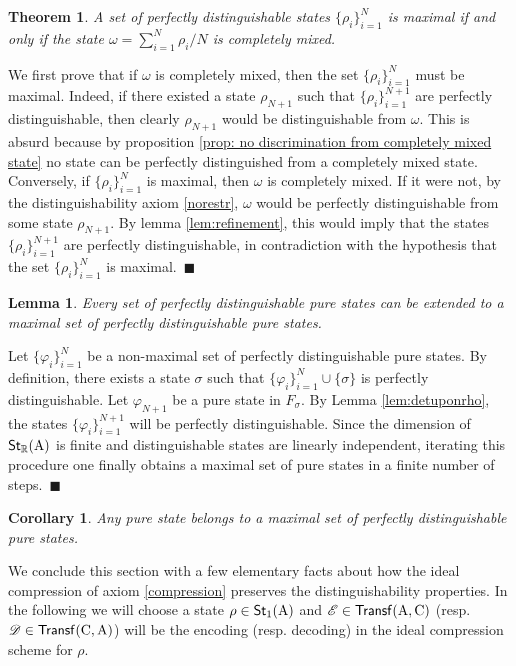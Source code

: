 \documentclass[12pt,aps,pra,showpacs,groupedaddress]{revtex4-1}
\newtheorem{lemma}{Lemma} \newtheorem{proposition}{Proposition}
\newtheorem{corollary}{Corollary} \newtheorem{theorem}{Theorem}
\def\Proof{\medskip\par\noindent{\bf Proof. }}
\def\qed{$\,\blacksquare$\par}
\def\rC{{\rm C}}
\def\Stset{{\mathsf{St}}}
\def\Trnset{{\mathsf{Transf}}}
\def\Reals{{\mathbb R}}
\begin{document}
\begin{theorem}
  A set of perfectly distinguishable states $\{\rho_i\}_{i=1}^N$ is maximal if and only if the state
  $\omega =\sum_{{i=1}}^{N} \rho_i/N$ is completely mixed.
  \label{theo:interndiscr}
\end{theorem}
\Proof We first prove that if $\omega$ is completely mixed, then the set
$\{\rho_{i}\}_{i=1}^{N}$ must be maximal. Indeed, if there existed a
state $\rho_{N+1}$ such that $\{\rho_{i}\}_{i=1}^{N+1}$ are perfectly
distinguishable, then clearly $\rho_{N+1}$ would be distinguishable
from $\omega$. This is absurd because by proposition \ref{prop: no
  discrimination from completely mixed state} no state can be
perfectly distinguished from a completely mixed state.  Conversely, if
$\{\rho_i\}_{i=1}^N$ is maximal, then $\omega$ is completely mixed. If
it were not, by the distinguishability axiom \ref{norestr}, $\omega$
would be perfectly distinguishable from some state $\rho_{N+1}$.  By
lemma \ref{lem:refinement}, this would imply that the states
$\{\rho_i\}_{i=1}^{N+1}$ are perfectly distinguishable, in
contradiction with the hypothesis that the set $\{\rho_i\}_{i=1}^N$ is
maximal.  \qed

\begin{lemma}\label{lem:extensiontomaximal}
  Every set of perfectly distinguishable pure states can be extended to a maximal set of perfectly
  distinguishable pure states.
\end{lemma}

\Proof Let $\{\varphi_i\}_{i=1}^N$ be a non-maximal set of perfectly
distinguishable pure states.  By definition, there exists a state
$\sigma$ such that $\{\varphi_i\}_{i=1}^N\cup\{\sigma\}$ is perfectly
distinguishable.  Let $\varphi_{N+1}$ be a pure state in $F_\sigma$. By
Lemma \ref{lem:detuponrho}, the states $\{\varphi_i\}_{i=1}^{N+1}$
will be perfectly distinguishable. Since the dimension of
$\Stset_\Reals (\rA)$ is finite and distinguishable states are
linearly independent, iterating this procedure one finally obtains a
maximal set of pure states in a finite number of steps.  \qed

\begin{corollary}\label{cor:purebelongs}
  Any pure state belongs to a maximal set of perfectly distinguishable
  pure states.
\end{corollary}

We conclude this section with a few elementary facts about how the ideal compression of axiom
\ref{compression} preserves the distinguishability properties. In the following we will choose a
state $\rho\in\Stset_1 (\rA)$ and $\tE \in\Trnset(\rA,\rC)$ (resp. $\tD \in\Trnset(\rC,\rA)$) will
be the encoding (resp. decoding) in the ideal compression scheme for $\rho$.
\end{document}
